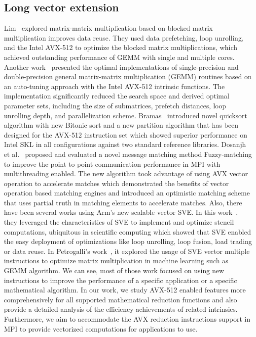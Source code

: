 \documentclass[sigconf]{acmart}
\newcommand{\sve}[0]{\textsc{SVE}\xspace}
\begin{document}
\subsection{Long vector extension}
Lim~\cite{Lim2018} explored matrix-matrix multiplication based on blocked matrix multiplication
improves data reuse. They used data prefetching, loop unrolling, and the Intel AVX-512
to optimize the blocked matrix multiplications, which achieved outstanding performance of GEMM
with single and multiple cores.
%
Another work~\cite{Kim19} presented the optimal implementations of single-precision and double-precision general matrix-matrix multiplication (GEMM) routines based on an auto-tuning approach with the Intel AVX-512 intrinsic functions.
The implementation significantly reduced the search space and derived optimal parameter sets, including the size of submatrices, prefetch distances, loop unrolling depth, and parallelization scheme.
%
Bramas~\cite{Bramas_2017} introduced novel quicksort algorithm with new Bitonic sort and a new
partition algorithm that has been designed for the AVX-512
instruction set which showed superior performance on Intel SKL in
all configurations against two standard reference libraries.
%
Dosanjh et al.~\cite{tag-match} proposed and evaluated a novel message matching method Fuzzy-matching
to improve the point to point communication performance in MPI with multithreading enabled.
The new algorithm took advantage of using AVX vector operation to accelerate matches
which demonstrated the benefits of vector operation based
matching engines and introduced an optimistic
matching scheme that uses partial truth in matching elements
to accelerate matches.
%
Also, there have been several works using Arm's new scalable vector SVE.
In this work~\cite{sve-stencil}, they leveraged the characteristics of \sve to implement and optimize
stencil computations, ubiquitous in scientific computing which showed
that \sve enabled the easy deployment of optimizations like loop unrolling,
loop fusion, load trading or data reuse.
%
In Petrogalli's work~\cite{sve_ml}, it explored the usage of SVE vector multiple
instructions to optimize matrix multiplication in machine learning such as GEMM algorithm.
%
We can see, most of those work focused on using new instructions
to improve the performance of a specific application or a specific mathematical algorithm.
In our work, we study AVX-512 enabled features more comprehensively for
all supported mathematical reduction functions and also provide
a detailed analysis of the efficiency achievements of related intrinsics.
Furthermore, we aim to accommodate the AVX reduction instructions support in MPI to provide
vectorized computations for applications to use.
\end{document}

